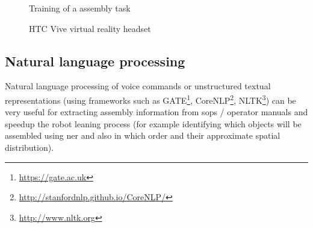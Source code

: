 \begin{figure}[H]
	\begin{floatrow}[2]
		{\caption[Training of a assembly task]{Training of a assembly task \cite{Webel2013}}\label{fig:ar-assembly}}
		{\caption[HTC Vive virtual reality headset]{HTC Vive virtual reality headset\protect\footnotemark}\label{fig:htc-vive}}
	\end{floatrow}
\end{figure}


%


\subsection{Natural language processing}

Natural language processing \cite{Manning1999,Jurafsky2000,Manning2008} of voice commands or unstructured textual representations (using frameworks such as GATE\footnote{\url{https://gate.ac.uk}}, CoreNLP\footnote{\url{http://stanfordnlp.github.io/CoreNLP/}}, NLTK\footnote{\url{http://www.nltk.org}}) can be very useful for extracting assembly information from \glspl{sop} / operator manuals and speedup the robot leaning process \cite{Tenorth2010,Stenmark2013,Stenmark2014,Stenmark2016} (for example identifying which objects will be assembled using \gls{ner} \cite{Ekbal2012,Rami2014} and also in which order and their approximate spatial distribution).

